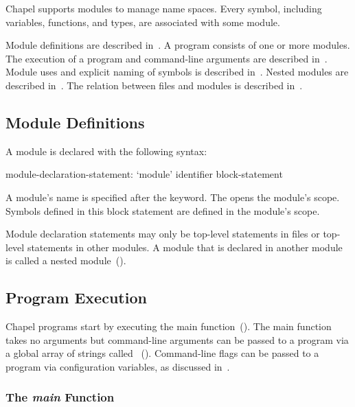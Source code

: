\label{Modules}


Chapel supports modules to manage name spaces.  Every symbol,
including variables, functions, and types, are associated with some
module.

Module definitions are described in~.  A
program consists of one or more modules.  The execution of a program
and command-line arguments are described in~.
Module uses and explicit naming of symbols is described
in~.  Nested modules are described
in~.  The relation between files and modules is
described in~.

\subsection{Module Definitions}
\label{Module_Definitions}


A module is declared with the following syntax:
\begin{syntax}
module-declaration-statement:
  `module' identifier block-statement
\end{syntax}
A module's name is specified after the  keyword.
The  opens the module's scope.  Symbols defined
in this block statement are defined in the module's scope.

Module declaration statements may only be top-level statements in
files or top-level statements in other modules.  A module that is
declared in another module is called a nested
module~().

\subsection{Program Execution}
\label{Program_Execution}

Chapel programs start by executing the main
function~().  The main function takes no
arguments but command-line arguments can be passed to a program via a
global array of strings
called ~().  Command-line
flags can be passed to a program via configuration variables, as
discussed in~.

\subsubsection{The {\em main} Function}
\label{The_main_Function}

